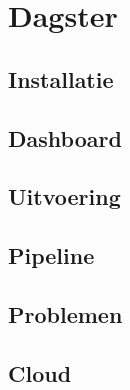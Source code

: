 \section{Dagster}
\subsection{Installatie}
\subsection{Dashboard}
\subsection{Uitvoering}
\subsection{Pipeline}
\subsection{Problemen}
\subsection{Cloud}